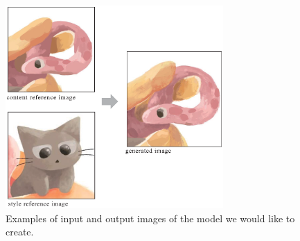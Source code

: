 \documentclass{mva_style}
\begin{document}
\begin{figure}
  \centering
  \includegraphics[width=83mm]{resource/haru.eps}
  \caption{Examples of input and output images of the model we would like to create.}
  \label{fig:haru}
\end{figure}
\end{document}
